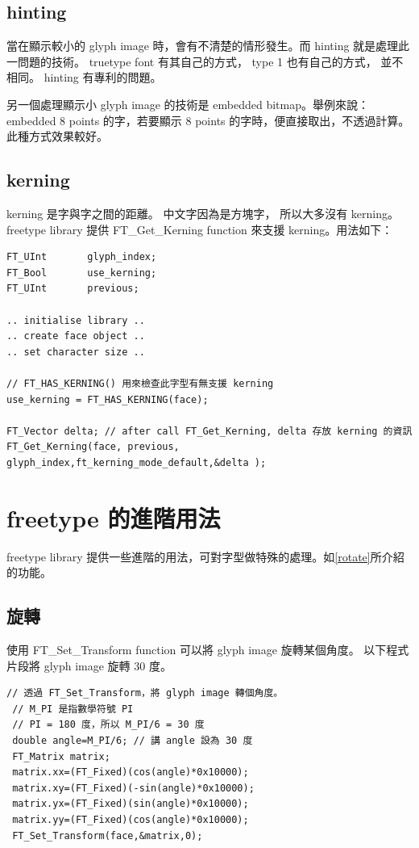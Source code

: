 \documentclass[12pt,a4]{article}
\begin{document}
\begin{CJK}{UTF8}{bsmi}
\subsection{hinting}
當在顯示較小的 glyph image 時，會有不清楚的情形發生。而 hinting
就是處理此一問題的技術。 truetype font 有其自己的方式， type 1 也有自己的方式，
並不相同。 hinting 有專利的問題。

另一個處理顯示小 glyph image 的技術是 embedded bitmap。舉例來說： embedded 8 points
的字，若要顯示 8 points 的字時，便直接取出，不透過計算。此種方式效果較好。
\subsection{kerning}
kerning 是字與字之間的距離。 中文字因為是方塊字， 所以大多沒有 kerning。
freetype library 提供 FT\_{}Get\_{}Kerning function
來支援 kerning。用法如下：
\begin{Verbatim}[commandchars=@\$?]
FT_UInt       glyph_index;
FT_Bool       use_kerning;
FT_UInt       previous;

.. initialise library ..
.. create face object ..
.. set character size ..

// FT_HAS_KERNING() 用來檢查此字型有無支援 kerning
use_kerning = FT_HAS_KERNING(face);

FT_Vector delta; // after call FT_Get_Kerning, delta 存放 kerning 的資訊
FT_Get_Kerning(face, previous, glyph_index,ft_kerning_mode_default,&delta );
\end{Verbatim}
\newpage
\section{freetype 的進階用法}
freetype library 提供一些進階的用法，可對字型做特殊的處理。如\ref{rotate}所介紹的功能。
\subsection{\label{rotate}旋轉}
使用 FT\_{}Set\_{}Transform function 可以將 glyph image 旋轉某個角度。
以下程式片段將 glyph image 旋轉 30 度。
\begin{Verbatim}[commandchars=+!?]
 // 透過 FT_Set_Transform，將 glyph image 轉個角度。
 // M_PI 是指數學符號 PI
 // PI = 180 度，所以 M_PI/6 = 30 度
 double angle=M_PI/6; // 講 angle 設為 30 度
 FT_Matrix matrix;
 matrix.xx=(FT_Fixed)(cos(angle)*0x10000);
 matrix.xy=(FT_Fixed)(-sin(angle)*0x10000);
 matrix.yx=(FT_Fixed)(sin(angle)*0x10000);
 matrix.yy=(FT_Fixed)(cos(angle)*0x10000);
 FT_Set_Transform(face,&matrix,0);
\end{Verbatim}


\end{CJK}
\end{document}
